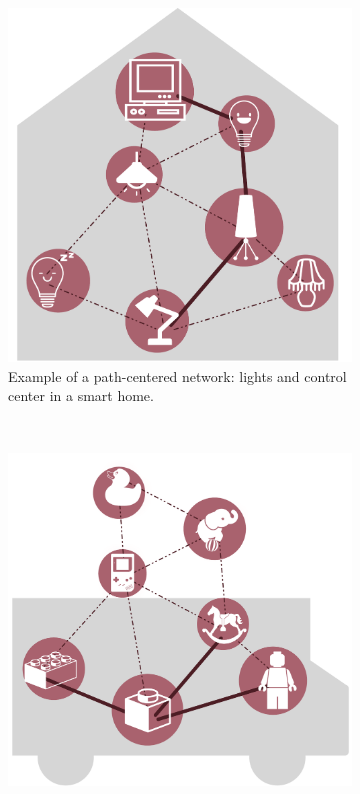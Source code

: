 \documentclass[a4paper,10pt]{scrartcl}
\begin{document}
\begin{figure}
        \centering
        \begin{subfigure}[b]{0.5\textwidth}
                \includegraphics[width=\textwidth]{../images/route_centered_example}
                \caption{Example of a path-centered network: lights and control center in a smart home.}
                \label{fig:rc_img}
        \end{subfigure}%
        ~ %
        \begin{subfigure}[b]{0.5\textwidth}
                \includegraphics[width=\textwidth]{../images/area_centered_example}

\end{subfigure}
\end{figure}
\end{document}
